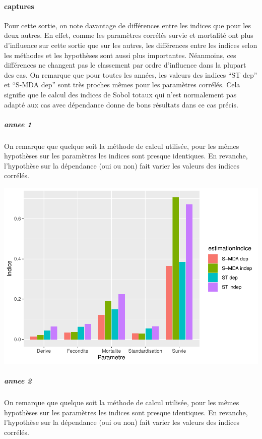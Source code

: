 \documentclass[
]{article}
\begin{document}
\hypertarget{captures}{%
\paragraph{captures}\label{captures}}

Pour cette sortie, on note davantage de différences entre les indices
que pour les deux autres. En effet, comme les paramètres corrélés survie
et mortalité ont plus d'influence sur cette sortie que sur les autres,
les différences entre les indices selon les méthodes et les hypothèses
sont aussi plus importantes. Néanmoins, ces différences ne changent pas
le classement par ordre d'influence dans la plupart des cas. On remarque
que pour toutes les années, les valeurs des indices ``ST dep'' et
``S-MDA dep'' sont très proches mêmes pour les paramètres corrélés. Cela
signifie que le calcul des indices de Sobol totaux qui n'est normalement
pas adapté aux cas avec dépendance donne de bons résultats dans ce cas
précis.

\hypertarget{annee-1-2}{%
\subparagraph{annee 1}\label{annee-1-2}}

On remarque que quelque soit la méthode de calcul utilisée, pour les
mêmes hypothèses sur les paramètres les indices sont presque identiques.
En revanche, l'hypothèse sur la dépendance (oui ou non) fait varier les
valeurs des indices corrélés.

\includegraphics{rapport_files/figure-latex/prtyzgs-1.pdf}

\hypertarget{annee-2-2}{%
\subparagraph{annee 2}\label{annee-2-2}}

On remarque que quelque soit la méthode de calcul utilisée, pour les
mêmes hypothèses sur les paramètres les indices sont presque identiques.
En revanche, l'hypothèse sur la dépendance (oui ou non) fait varier les
valeurs des indices corrélés.
\end{document}
